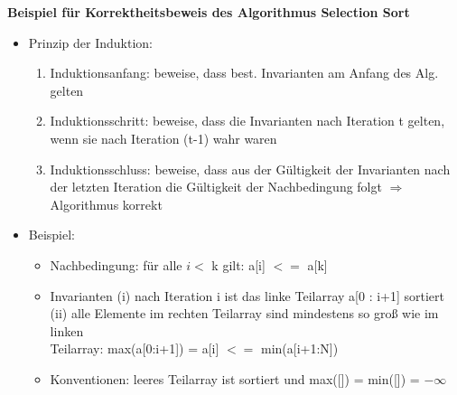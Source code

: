\documentclass[11pt, fleqn]{scrreprt}
\begin{document}
	\textbf{Beispiel für Korrektheitsbeweis des Algorithmus Selection Sort}
	\begin{itemize}
		\item Prinzip der Induktion:
		\begin{enumerate}
			\item Induktionsanfang: beweise, dass best. Invarianten am Anfang des Alg. gelten
			\item Induktionsschritt: beweise, dass die Invarianten nach Iteration t gelten, wenn sie nach Iteration (t-1) wahr waren
			\item Induktionsschluss: beweise, dass aus der Gültigkeit der Invarianten nach der letzten Iteration die Gültigkeit der Nachbedingung folgt $\Rightarrow$ Algorithmus korrekt
		\end{enumerate}
		\item Beispiel: 
		\begin{itemize}[label={}]
			\item Nachbedingung: für alle $i < $ k gilt: a[i] $<=$ a[k]
			\item Invarianten (i) nach Iteration i ist das linke Teilarray a[0 : i+1] sortiert \\
			\hspace*{2cm}(ii) alle Elemente im rechten Teilarray sind mindestens so groß wie im linken \\
			\hspace*{2,6cm}Teilarray: max(a[0:i+1]) = a[i] $<=$ min(a[i+1:N])
			\item Konventionen: leeres Teilarray ist sortiert und max([]) = min([]) = $- \infty$
		\end{itemize}
		

\end{itemize}
\end{document}
